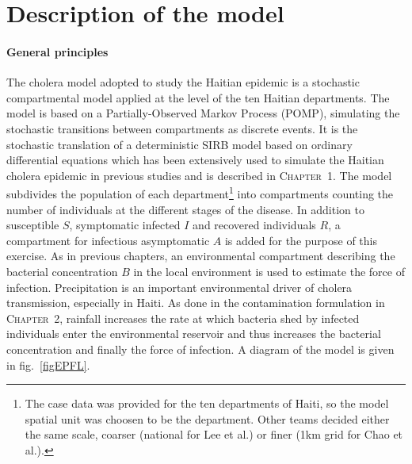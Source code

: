 \section{Description of the model}

\paragraph{General principles} The cholera model adopted to study the Haitian epidemic is a stochastic compartmental model applied at the level of the ten Haitian departments. 
The model is based on a Partially-Observed Markov Process (POMP), simulating the stochastic transitions between compartments as discrete events. 
It is the stochastic translation of a deterministic SIRB model based on ordinary differential equations which has been extensively used to simulate the Haitian cholera epidemic in previous studies\cite[-8\baselineskip]{Rinaldo:Reassessment20102011:2012,Bertuzzo:ProbabilityExtinctionHaiti:2016,Pasetto:RealtimeForecastingCholera:2018} and is described in \textsc{Chapter~1}. %
The model subdivides the population of each department\footnote[][9\baselineskip]{The case data was provided for the ten departments of Haiti, so the model spatial unit was choosen to be the department. Other teams decided either the same scale, coarser (national for Lee et al.) or finer (1km grid for Chao et al.).} into compartments counting the number of individuals at the different stages of the disease. In addition to susceptible $S$, symptomatic infected $I$ and recovered individuals $R$, a compartment for infectious asymptomatic $A$ is added for the purpose of this exercise. As in previous chapters, an environmental compartment describing the bacterial concentration $B$ in the local environment is used to estimate the force of infection. Precipitation is an important environmental driver of cholera transmission\cite{Camacho:CholeraEpidemicYemen:2018}, especially in Haiti. As done in the contamination formulation in \textsc{Chapter~2}, rainfall increases the rate at which bacteria shed by infected individuals enter the environmental reservoir and thus increases the bacterial concentration and finally the force of infection. A diagram of the model is given in fig.~\ref{figEPFL}.
